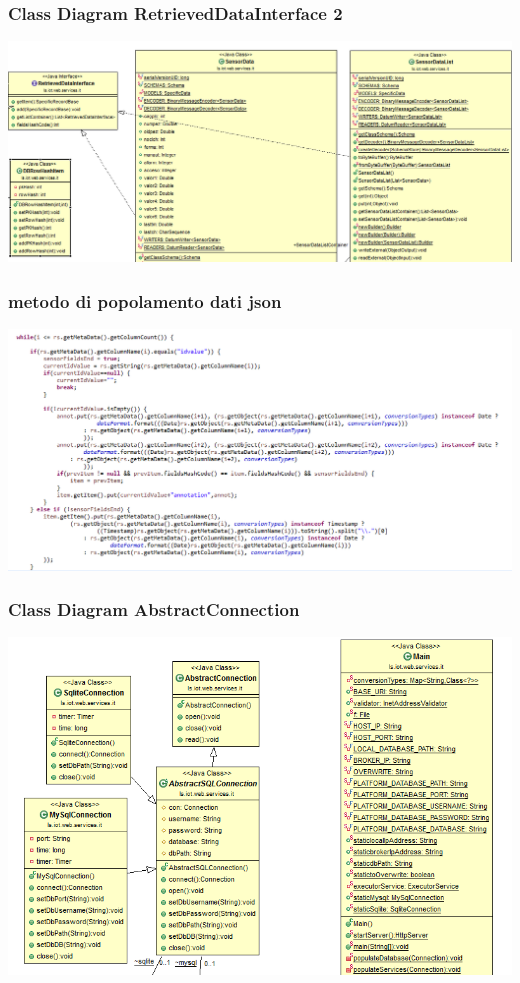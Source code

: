 \documentclass{beamer}
\begin{document}
\begin{frame}
\frametitle{Class Diagram RetrievedDataInterface 2}
\includegraphics[width=1\textwidth]{images/ClassDiagram1.png}
\end{frame}

\begin{frame}
\frametitle{metodo di popolamento dati json}
\includegraphics[width=1\textwidth]{images/popolamento-json.png}
\end{frame}

\begin{frame}
\frametitle{Class Diagram AbstractConnection}
\includegraphics[width=1\textwidth]{images/main.png}
\end{frame}
\end{document}
